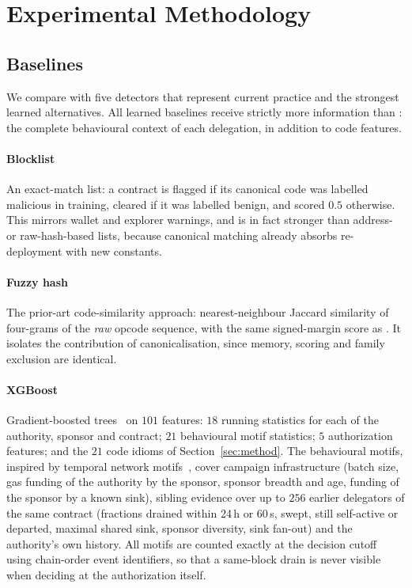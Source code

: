 \section{Experimental Methodology}
\label{sec:setup}

\subsection{Baselines}
We compare \dn{} with five detectors that represent current practice and the strongest learned alternatives. All learned baselines receive strictly more information than \dn{}: the complete behavioural context of each delegation, in addition to code features.

\paragraph{Blocklist} An exact-match list: a contract is flagged if its canonical code was labelled malicious in training, cleared if it was labelled benign, and scored $0.5$ otherwise. This mirrors wallet and explorer warnings, and is in fact stronger than address- or raw-hash-based lists, because canonical matching already absorbs re-deployment with new constants.

\paragraph{Fuzzy hash} The prior-art code-similarity approach: nearest-neighbour Jaccard similarity of four-grams of the \emph{raw} opcode sequence, with the same signed-margin score as \dn{}. It isolates the contribution of canonicalisation, since memory, scoring and family exclusion are identical.

\paragraph{XGBoost} Gradient-boosted trees~\cite{chen2016xgboost} on $101$ features: $18$ running statistics for each of the authority, sponsor and contract; $21$ behavioural motif statistics; $5$ authorization features; and the $21$ code idioms of Section~\ref{sec:method}. The behavioural motifs, inspired by temporal network motifs~\cite{paranjape2017motifs}, cover campaign infrastructure (batch size, gas funding of the authority by the sponsor, sponsor breadth and age, funding of the sponsor by a known sink), sibling evidence over up to $256$ earlier delegators of the same contract (fractions drained within 24\,h or 60\,s, swept, still self-active or departed, maximal shared sink, sponsor diversity, sink fan-out) and the authority's own history. All motifs are counted exactly at the decision cutoff using chain-order event identifiers, so that a same-block drain is never visible when deciding at the authorization itself.

